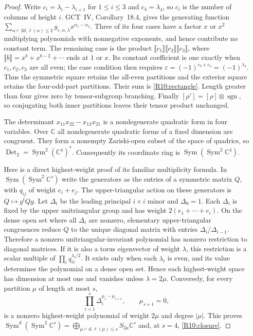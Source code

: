 \documentclass[11pt,a4paper]{article}
\theoremstyle{definition}\newtheorem{definition}{Definition}
\begin{document}
\begin{proof}
Write $c_i=\lambda_i-\lambda_{i+1}$ for $1\leq i\leq3$ and
$c_4=\lambda_4$, so $c_i$ is the number of columns of height $i$.
GCT~IV, Corollary~18.4, gives the generating function
$\sum_{\alpha\vdash2d,\ell(\alpha)\leq2}
g_{\varepsilon,\alpha,\lambda}x^{\alpha_1-\alpha_2}$.
Three of its four cases have a factor $x$ or $x^2$ multiplying
polynomials with nonnegative exponents, and hence contribute no
constant term. The remaining case is the product
$\llbracket c_1\rrbracket\llbracket c_2\rrbracket
\llbracket c_3\rrbracket$, where
$\llbracket b\rrbracket=x^b+x^{b-2}+\cdots$ ends at $1$ or $x$.
Its constant coefficient is one exactly when $c_1,c_2,c_3$ are all
even; the case condition then requires
$\varepsilon=(-1)^{c_3+c_4}=(-1)^{\lambda_4}$.
Thus the symmetric square retains the all-even partitions and the
exterior square retains the four-odd-part partitions. Their sum is
\eqref{R10:rectangle}. Length greater than four gives zero by
tensor-subgroup branching. Finally
$[\rho']=[\rho]\otimes\operatorname{sgn}$, so conjugating both
inner partitions leaves their tensor product unchanged.

The determinant $x_{11}x_{22}-x_{12}x_{21}$ is a nondegenerate
quadratic form in four variables. Over $\mathbb C$ all nondegenerate
quadratic forms of a fixed dimension are congruent. They form a
nonempty Zariski-open subset of the space of quadrics, so
$\operatorname{Det}_2=\operatorname{Sym}^2(\mathbb C^4)^*$.
Consequently its coordinate ring is
$\operatorname{Sym}(\operatorname{Sym}^2\mathbb C^4)$.

Here is a direct highest-weight proof of its familiar multiplicity
formula. In $\operatorname{Sym}(\operatorname{Sym}^2\mathbb C^s)$
write the generators as the entries of a symmetric matrix $Q$,
with $q_{ij}$ of weight $e_i+e_j$. The upper-triangular action on
these generators is $Q\mapsto g^tQg$.
Let $\Delta_i$ be the leading principal $i\times i$ minor and
$\Delta_0=1$. Each $\Delta_i$ is fixed by the upper unitriangular
group and has weight $2(e_1+\cdots+e_i)$.
On the dense open set where all $\Delta_i$ are nonzero, elementary
upper-triangular congruences reduce $Q$ to the unique diagonal
matrix with entries $\Delta_i/\Delta_{i-1}$.
Therefore a nonzero unitriangular-invariant polynomial has nonzero
restriction to diagonal matrices. If it is also a torus eigenvector
of weight $\lambda$, this restriction is a scalar multiple of
$\prod_i q_{ii}^{\lambda_i/2}$. It exists only when each
$\lambda_i$ is even, and its value determines the polynomial on a
dense open set. Hence each highest-weight space has dimension at
most one and vanishes unless $\lambda=2\mu$.
Conversely, for every partition $\mu$ of length at most $s$,
\[
 \prod_{i=1}^s\Delta_i^{\mu_i-\mu_{i+1}},\qquad\mu_{s+1}=0,
\]
is a nonzero highest-weight polynomial of weight $2\mu$ and
degree $|\mu|$. This proves
$\operatorname{Sym}^d(\operatorname{Sym}^2\mathbb C^s)
=\bigoplus_{\mu\vdash d,\ell(\mu)\leq s}S_{2\mu}\mathbb C^s$
and, at $s=4$, \eqref{R10:closure}.
\end{proof}
\end{document}
